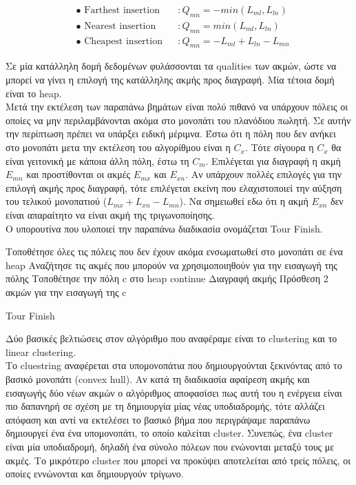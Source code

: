 \documentclass[oneside,12pt]{book}
\theoremstyle{definition}
\begin{document}
\begin{align*}
	& \bullet \text{ Farthest insertion} &&: Q_{mn} = - min(L_{ml}, L_{ln}) \\
	& \bullet \text{ Nearest insertion} &&: Q_{mn} = min(L_{ml}, L_{ln}) \\
	& \bullet \text{ Cheapest insertion} &&: Q_{mn} = -L_{ml} + L_{ln} - L_{mn} 
\end{align*}  

Σε μία κατάλληλη δομή δεδομένων φυλάσσονται τα qualities των ακμών, ώστε να μπορεί να γίνει η επιλογή της κατάλληλης ακμής προς διαγραφή. Μία τέτοια δομή είναι το heap. \\

Μετά την εκτέλεση των παραπάνω βημάτων είναι πολύ πιθανό να υπάρχουν πόλεις οι οποίες να μην περιλαμβάνονται ακόμα στο μονοπάτι του πλανόδιου πωλητή. Σε αυτήν την περίπτωση πρέπει να υπάρξει ειδική μέριμνα. Έστω ότι η πόλη που δεν ανήκει στο μονοπάτι μετα την εκτέλεση του αλγορίθμου είναι η \(C_x\). Τότε σίγουρα η \(C_x\) θα είναι γειτονική με κάποια άλλη πόλη, έστω τη \(C_m\). Επιλέγεται για διαγραφή η ακμή \(E_{mn}\) και προστίθονται οι ακμές \(E_{mx}\) και \(E_{xn}\). Αν υπάρχουν πολλές επιλογές για την επιλογή ακμής προς διαγραφή, τότε επιλέγεται εκείνη που ελαχιστοποιεί την αύξηση του τελικού μονοπατιού (\(L_{mx} + L_{xn} - L_{mn}\)). Να σημειωθεί εδω ότι η ακμή \(E_{xn}\) δεν είναι απαραίτητο να είναι ακμή της τριγωνοποίησης. \\

Ο υπορουτίνα που υλοποιεί την παραπάνω διαδικασία ονομάζεται Tour Finish. \\

\begin{algorithm}[H]
	\SetAlgoLined
	
	Τοποθέτησε όλες τις πόλεις που δεν έχουν ακόμα ενσωματωθεί στο μονοπάτι σε ένα heap \;
	{Αναζήτησε τις ακμές που μπορούν να χρησιμοποιηθούν για την εισαγωγή της πόλης \;
	{Τοποθέτησε την πόλη c στο heap \;
	continue \;}
	Διαγραφή ακμής \;
	Πρόσθεση 2 ακμών για την εισαγωγή της c \;}
	
	\caption{Tour Finish}
\end{algorithm}

Δύο βασικές βελτιώσεις στον αλγόριθμο που αναφέραμε είναι το clustering και το linear clustering. \\

Το cluestring αναφέρεται στα υπομονοπάτια που δημιουργούνται ξεκινόντας από το βασικό μονοπάτι (convex hull). Αν κατά τη διαδικασία αφαίρεση ακμής και εισαγωγής δύο νέων ακμών ο αλγόριθμος αποφασίσει πως αυτή του η ενέργεια είναι πιο δαπανηρή σε σχέση με τη δημιουργία μίας νέας υποδιαδρομής, τότε αλλάζει απόφαση και αντί να εκτελέσει το βασικό βήμα που περιγράψαμε παραπάνω δημιουργεί ένα ένα υπομονοπάτι, το οποίο καλείται cluster. Συνεπώς, ένα cluster είναι μία υποδιαδρομή, δηλαδή ένα σύνολο πόλεων που ενώνονται μεταξύ τους με ακμές. Το μικρότερο cluster που μπορεί να προκύψει αποτελείται από τρείς πόλεις, οι οποίες εννώνονται και δημιουργούν τρίγωνο. \\
\end{document}
